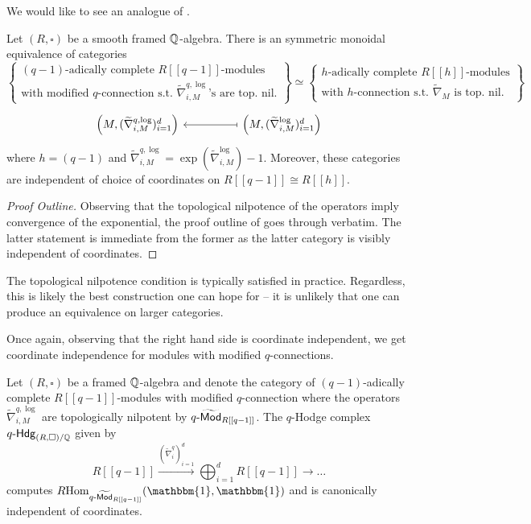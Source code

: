 We would like to see an analogue of . 
\begin{proposition}\label{prop: R-modules with modified connection}
    Let $(R,\square)$ be a smooth framed $\mathbb{Q}$-algebra. There is an symmetric monoidal equivalence of categories 
    $$\left\{\substack{(q-1)\text{-adically complete }R[[q-1]]\text{-modules} \\ \text{with modified }q\text{-connection s.t. }\widetilde{\nabla}^{q,\log}_{i,M}\text{'s are top. nil.}}\right\}\simeq\left\{\substack{h\text{-adically complete }R[[h]]\text{-modules} \\ \text{with }h\text{-connection s.t. }\widetilde{\nabla}_{M}\text{ is top. nil.}}\right\}$$
    $$%
    \begin{tikzcd}
        {\left(M,(\widetilde{\nabla}^{q,\log}_{i,M})_{i=1}^{d}\right)} && {\left(M,(\widetilde{\nabla}_{i,M}^{\log})_{i=1}^{d}\right)}
        \arrow[maps to, from=1-3, to=1-1]
    \end{tikzcd}$$
    where $h=(q-1)$ and $\widetilde{\nabla}^{q,\log}_{i,M}=\exp(\widetilde{\nabla}^{\log}_{i,M})-1$. Moreover, these categories are independent of choice of coordinates on $R[[q-1]]\cong R[[h]]$. 
\end{proposition}
\begin{proof}[Proof Outline]
    Observing that the topological nilpotence of the operators imply convergence of the exponential, the proof outline of  goes through verbatim. The latter statement is immediate from the former as the latter category is visibly independent of coordinates.
\end{proof}
\begin{remark}
    The topological nilpotence condition is typically satisfied in practice. Regardless, this is likely the best construction one can hope for -- it is unlikely that one can produce an equivalence on larger categories.  
\end{remark}
Once again, observing that the right hand side is coordinate independent, we get coordinate independence for modules with modified $q$-connections. 
\begin{corollary}\label{corr: modules with modified q-connection are coordinate independent}
    Let $(R,\square)$ be a framed $\mathbb{Q}$-algebra and denote the category of $(q-1)$-adically complete $R[[q-1]]$-modules with modified $q$-connection where the operators $\widetilde{\nabla}_{i,M}^{q,\log}$ are topologically nilpotent by $q\text{-}\widetilde{\mathsf{Mod}}_{R[[q-1]]}$. The $q$-Hodge complex $q\text{-}\mathsf{Hdg}_{(R,\square)/\mathbb{Q}}$ given by 
    $$R[[q-1]]\xrightarrow{(\widetilde{\nabla}_{i}^{q})_{i=1}^{d}}\bigoplus_{i=1}^{d}R[[q-1]]\longrightarrow\dots$$
    computes $R\Hom_{q\dash\widetilde{\Mod}_{R[[q-1]]}}(\mathbbm{1},\mathbbm{1})$ and is canonically independent of coordinates. 
\end{corollary}
